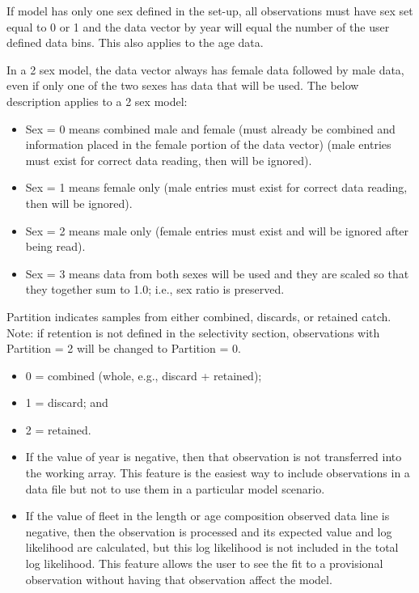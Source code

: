 If model has only one sex defined in the set-up, all observations must have sex set equal to 0 or 1 and the data vector by year will equal the number of the user defined data bins. This also applies to the age data. 

In a 2 sex model, the data vector always has female data followed by male data, even if only one of the two sexes has data that will be used. The below description applies to a 2 sex model:
\begin{itemize}
	\item Sex = 0 means combined male and female (must already be combined and information placed in the female portion of the data vector) (male entries must exist for correct data reading, then will be ignored).
	\item Sex = 1 means female only (male entries must exist for correct data reading, then will be ignored).
	\item Sex = 2 means male only (female entries must exist and will be ignored after being read).
	\item Sex = 3 means data from both sexes will be used and they are scaled so that they together sum to 1.0; i.e., sex ratio is preserved.
\end{itemize}

Partition indicates samples from either combined, discards, or retained catch. 
Note: if retention is not defined in the selectivity section, observations with Partition = 2 will be changed to Partition = 0.
\begin{itemize}
	\item 0 = combined (whole, e.g., discard + retained);
	\item 1 = discard; and
	\item 2 = retained.
\end{itemize}

\begin{itemize}
	\item If the value of year is negative, then that observation is not transferred into the working array. This feature is the easiest way to include observations in a data file but not to use them in a particular model scenario.
	\item If the value of fleet in the length or age composition observed data line is negative, then the observation is processed and its expected value and log likelihood are calculated, but this log likelihood is not included in the total log likelihood. This feature allows the user to see the fit to a provisional observation without having that observation affect the model.
\end{itemize}

